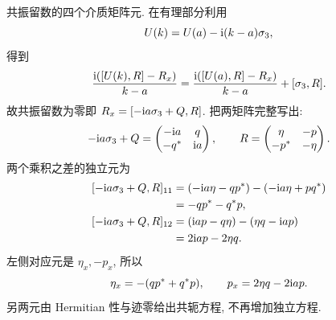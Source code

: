 \par\smallskip\noindent 共振留数的四个介质矩阵元.\quad
在有理部分利用
\begin{equation*}
 U(k)= U(a)-\mathrm{i}(k-a)\sigma_3,
\end{equation*}
得到
\begin{equation*}
\dfrac{\mathrm{i}([ U(k),R]-R_x)}{k-a}
=\dfrac{\mathrm{i}([ U(a),R]-R_x)}{k-a}+[\sigma_3,R].
\end{equation*}
故共振留数为零即
$R_x=[-\mathrm{i} a\sigma_3+Q,R]$.
把两矩阵完整写出:
\begin{equation*}
-\mathrm{i} a\sigma_3+Q
=\begin{pmatrix}-\mathrm{i} a&q\\-{q}^{*}&\mathrm{i} a\end{pmatrix},\qquad
R=\begin{pmatrix}\eta&-p\\-{p}^{*}&-\eta\end{pmatrix}.
\end{equation*}
两个乘积之差的独立元为
\begin{equation*}
\begin{aligned}
\relax[-\ii a\sg+Q,R]_{11}
&=(-\ii a\eta-q\conj p)-(-\ii a\eta+p\conj q)\\
&=-q\conj p-\conj q p,\\
[-\ii a\sg+Q,R]_{12}
&=(\ii ap-q\eta)-(\eta q-\ii ap)\\
&=2\ii ap-2\eta q.
\end{aligned}
\end{equation*}
左侧对应元是 $\eta_x,-p_x$, 所以
\begin{equation*}
\eta_x=-(q{p}^{*}+{q}^{*} p),\qquad
p_x=2\eta q-2\mathrm{i} ap.
\end{equation*}
另两元由 Hermitian 性与迹零给出共轭方程, 不再增加独立方程.

